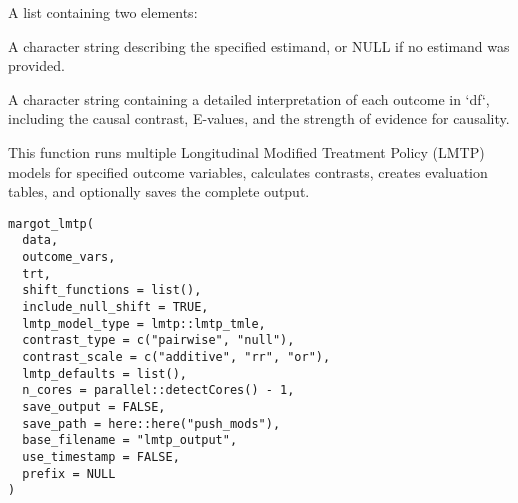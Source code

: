 \documentclass[a4paper]{book}
\begin{document}
%
\begin{Value}
A list containing two elements:
\begin{ldescription}
\item[\code{estimand\_description}] A character string describing the specified estimand, or NULL if no estimand was provided.
\item[\code{interpretation}] A character string containing a detailed interpretation of each outcome in `df`,
including the causal contrast, E-values, and the strength of evidence for causality.
\end{ldescription}
\end{Value}
%
\begin{Examples}
\end{Examples}
%
\begin{Description}
This function runs multiple Longitudinal Modified Treatment Policy (LMTP) models for specified outcome variables,
calculates contrasts, creates evaluation tables, and optionally saves the complete output.
\end{Description}
%
\begin{Usage}
\begin{verbatim}
margot_lmtp(
  data,
  outcome_vars,
  trt,
  shift_functions = list(),
  include_null_shift = TRUE,
  lmtp_model_type = lmtp::lmtp_tmle,
  contrast_type = c("pairwise", "null"),
  contrast_scale = c("additive", "rr", "or"),
  lmtp_defaults = list(),
  n_cores = parallel::detectCores() - 1,
  save_output = FALSE,
  save_path = here::here("push_mods"),
  base_filename = "lmtp_output",
  use_timestamp = FALSE,
  prefix = NULL
)
\end{verbatim}
\end{Usage}
%
\end{document}

